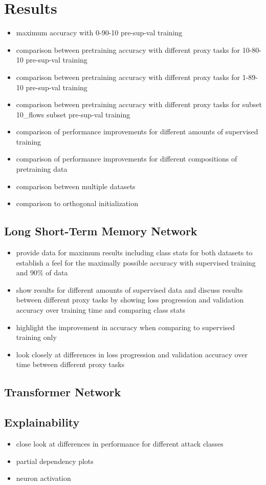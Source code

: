 \chapter{Results} \label{sec:results}

\begin{itemize}
	\item maximum accuracy with 0-90-10 pre-sup-val training
	\item comparison between pretraining accuracy with different proxy tasks for 10-80-10 pre-sup-val training
	\item comparison between pretraining accuracy with different proxy tasks for 1-89-10 pre-sup-val training
	\item comparison between pretraining accuracy with different proxy tasks for subset 10\_flows subset pre-sup-val training
	\item comparison of performance improvements for different amounts of supervised training
	\item comparison of performance improvements for different compositions of pretraining data
	\item comparison between multiple datasets
	\item comparison to orthogonal initialization
\end{itemize}

\section{Long Short-Term Memory Network}


\begin{itemize}
	\item provide data for maximum results including class stats for both datasets to establish a feel for the maximally possible accuracy with supervised training and 90\% of data
	\item show results for different amounts of supervised data and discuss results between different proxy tasks by showing loss progression and validation accuracy over training time and comparing class stats
	\item highlight the improvement in accuracy when comparing to supervised training only
	\item look closely at differences in loss progression and validation accuracy over time between different proxy tasks
\end{itemize}

\section{Transformer Network}

\section{Explainability}

\begin{itemize}
	\item close look at differences in performance for different attack classes
	\item partial dependency plots
	\item neuron activation
\end{itemize}

\newpage
